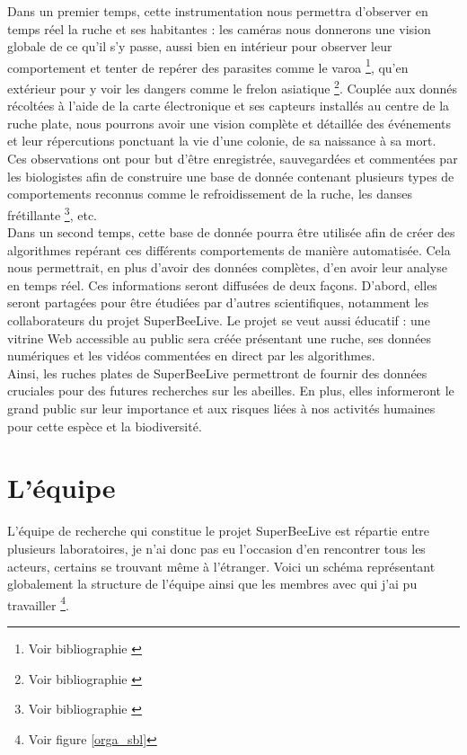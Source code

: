 \documentclass[11pt,french,a4paper]{report}
\begin{document}
Dans un premier temps, cette instrumentation nous permettra d'observer en temps réel la ruche et ses habitantes : 
les caméras nous donnerons une vision globale de ce qu'il s'y passe, aussi bien en intérieur pour observer leur 
comportement et tenter de repérer des parasites comme le varoa \footnote{Voir bibliographie \cite{ref11}}, 
qu'en extérieur pour y voir les dangers comme le frelon asiatique \footnote{Voir bibliographie \cite{ref12}}.
Couplée aux donnés récoltées à l'aide de la carte électronique et ses capteurs installés au centre de la ruche plate, 
nous pourrons avoir une vision complète et détaillée des événements et leur répercutions ponctuant la vie d'une colonie,
de sa naissance à sa mort. \\
Ces observations ont pour but d'être enregistrée, sauvegardées et commentées par les biologistes afin de construire une base
de donnée contenant plusieurs types de comportements reconnus comme le refroidissement de la ruche, les danses frétillante \footnote{Voir bibliographie \cite{ref10}}, 
etc.  
\\
Dans un second temps, cette base de donnée pourra être utilisée afin de créer des algorithmes repérant ces différents comportements
de manière automatisée. Cela nous permettrait, en plus d'avoir des données complètes, d'en avoir leur analyse en 
temps réel. Ces informations seront diffusées de deux façons. D'abord, elles seront partagées pour être étudiées par d'autres scientifiques, 
notamment les collaborateurs du projet SuperBeeLive. Le projet se veut aussi éducatif : une vitrine Web accessible au public 
sera créée présentant une ruche, ses données numériques et les vidéos commentées en direct par les algorithmes. \\


Ainsi, les ruches plates de SuperBeeLive permettront de fournir des données cruciales pour des futures recherches sur les 
abeilles. En plus, elles informeront le grand public sur leur importance et aux risques liées à nos activités humaines pour 
cette espèce et la biodiversité. 


\section{L'équipe}
L'équipe de recherche qui constitue le projet SuperBeeLive est répartie entre plusieurs laboratoires, je n'ai donc pas eu l'occasion
d'en rencontrer tous les acteurs, certains se trouvant même à l'étranger. Voici un schéma représentant globalement la structure
de l'équipe ainsi que les membres avec qui j'ai pu travailler \footnote{ Voir figure \ref{orga_sbl} }. \\
\end{document}
